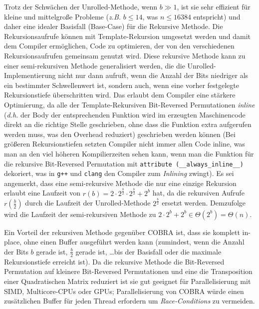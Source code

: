 \documentclass[10pt]{article}
\begin{document}
Trotz der Schwächen der Unrolled-Methode, wenn $b \gg 1$, ist sie sehr effizient 
für kleine und mittelgroße Probleme (\emph{z.B.} $b \leq 14$, was $n \leq 16384$ entspricht)
und daher eine idealer Basisfall (Base-Case) für die Rekursive Methode. Die Rekursionsaufrufe 
können mit Template-Rekursion umgesetzt werden und damit dem Compiler ermöglichen, 
Code zu optimieren, der von den verschiedenen Rekursionsaufrufen 
gemeinsam genutzt wird. Diese rekursive Methode kann zu einer semi-rekursiven 
Methode generalisiert werden, die die Unrolled-Implementierung nicht nur dann aufruft, 
wenn die Anzahl der Bits niedriger als ein bestimmter Schwellenwert ist,
sondern auch, wenn eine vorher festgelegte Rekursionstiefe überschritten wird. 
Das erlaubt dem Compiler eine stärkere Optimierung, da alle der Template-Rekursiven 
Bit-Reversed Permutationen {\it inline} (\emph{d.h.} der Body der entsprechenden 
Funktion wird im erzeugten Maschinencode direkt an die richtige Stelle geschrieben, 
ohne dass die Funktion extra aufgerufen werden muss, was den Overhead reduziert) 
geschrieben werden können (Bei größeren Rekursionstiefen setzten Compiler nicht immer 
allen Code inline, was man an den viel höheren Kompilierzeiten sehen kann, wenn man die 
Funktion für die rekursive Bit-Reversed Permutation mit {\tt attribute~(\_\_always\_inline\_\_)}
dekoriert, was in  {\tt g++} und {\tt clang} den Compiler zum {\it Inlining} zwingt).
Es sei angemerkt, dass eine semi-rekursive Methode die nur eine einzige Rekursion 
erlaubt eine Laufzeit von  $r(b) = 2 \cdot 2^{\frac{b}{2}} \cdot 2^{\frac{b}{2}} + 2^b$ hat, 
da die rekursiven Aufrufe $r(\frac{b}{2})$ durch die Laufzeit der Unrolled-Methode 
$2^{\frac{b}{2}}$ ersetzt werden. Demzufolge wird die Laufzeit der semi-rekursiven Methode zu 
$2\cdot 2^b + 2^b \in \Theta(2^b) = \Theta(n)$.

Ein Vorteil der rekursiven Methode gegenüber COBRA ist, dass sie komplett in-place, ohne 
einen Buffer ausgeführt werden kann (zumindest, wenn die Anzahl der Bits $b$ gerade ist,
$\frac{b}{2}$ gerade ist, \ldots bis der Basisfall oder die maximale Rekursionstiefe erreicht ist).
Da die rekursive Methode die Bit-Reversed Permutation auf kleinere Bit-Reversed Permutationen und eine 
die Transposition einer Quadratischen Matrix reduziert ist sie gut geeignet für Parallelisierung mit SIMD, 
Multicore-CPUs oder GPUs; Parallelisierung von COBRA würde einen zusätzlichen Buffer für jeden Thread 
erfordern um {\it Race-Conditions} zu vermeiden.\newline
\end{document}
